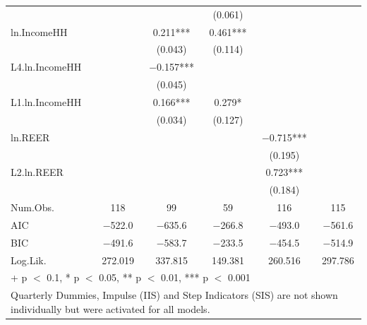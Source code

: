 \begin{table}
{\begin{tabular}[t]{lccccc}
 &  &  & (\num{0.061}) &  & \\
ln.IncomeHH &  & \num{0.211}*** & \num{0.461}*** &  & \\
 &  & (\num{0.043}) & (\num{0.114}) &  & \\
L4.ln.IncomeHH &  & \num{-0.157}*** &  &  & \\
 &  & (\num{0.045}) &  &  & \\
L1.ln.IncomeHH &  & \num{0.166}*** & \num{0.279}* &  & \\
 &  & (\num{0.034}) & (\num{0.127}) &  & \\
ln.REER &  &  &  & \num{-0.715}*** & \\
 &  &  &  & (\num{0.195}) & \\
L2.ln.REER &  &  &  & \num{0.723}*** & \\
 &  &  &  & (\num{0.184}) & \\
\midrule
Num.Obs. & \num{118} & \num{99} & \num{59} & \num{116} & \num{115}\\
AIC & \num{-522.0} & \num{-635.6} & \num{-266.8} & \num{-493.0} & \num{-561.6}\\
BIC & \num{-491.6} & \num{-583.7} & \num{-233.5} & \num{-454.5} & \num{-514.9}\\
Log.Lik. & \num{272.019} & \num{337.815} & \num{149.381} & \num{260.516} & \num{297.786}\\
\bottomrule
\multicolumn{6}{l}{\rule{0pt}{1em}+ p $<$ 0.1, * p $<$ 0.05, ** p $<$ 0.01, *** p $<$ 0.001}\\
\multicolumn{6}{l}{\rule{0pt}{1em}Quarterly Dummies, Impulse (IIS) and Step Indicators (SIS) are not shown individually but were activated for all models.}\\
\end{tabular}}
\end{table}
